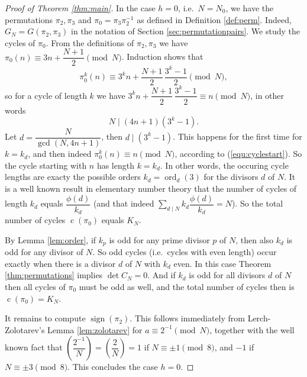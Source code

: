 \documentclass[10pt]{article}
\theoremstyle{definition}
\newcommand{\dsum}{\displaystyle\sum}
\newcommand{\jacobi}[2]{\displaystyle\left(\dfrac{#1}{#2}\right)}
\DeclareMathOperator{\ord}{ord}
\DeclareMathOperator{\sign}{sign}
\DeclareMathOperator{\cl}{c}
\begin{document}
\begin{proof}[Proof of Theorem \ref{thm:main}]
    In the case $ h = 0 $, i.e.\ $ N = N_0 $, we have the permutations $ \pi_2, \pi_3 $ and
    $ \pi_0 = \pi_3 \pi_2^{-1} $ as defined in Definition \ref{def:perm}. Indeed,
    $ G_N = G(\pi_2,\pi_3) $ in the notation of Section \ref{sec:permutationpairs}. We study the cycles of
    $ \pi_0 $. From the definitions of $ \pi_2, \pi_3 $ we have
    $ \pi_0(n) \equiv 3n + \dfrac{N+1}{2} \pmod{N} $. Induction shows that
    \begin{equation} \label{equ:cyclestart}
        \pi_0^k(n) \equiv 3^k n + \dfrac{N+1}{2} \, \dfrac{3^k-1}{2} \pmod{N} ,
    \end{equation}
    so for a cycle of length $ k $ we have
    $ 3^k n + \dfrac{N+1}{2} \, \dfrac{3^k-1}{2} \equiv n \pmod{N} $, in other words
    \begin{equation} \label{equ:cycle}
        N \mid (4n+1) (3^k-1) .
    \end{equation}
    Let $ d = \dfrac{N}{\gcd\left(N,4n+1\right)} $, then $ d \mid (3^k-1) $. This happens for the first time
    for $ k = k_d $, and then indeed $ \pi_0^k(n) \equiv n \pmod{N} $, according to (\ref{equ:cyclestart}).
    So the cycle starting with $ n $ has length $ k = k_d $. In other words, the occuring cycle lengths are
    exacty the possible orders $ k_d = \ord_d(3) $ for the divisors $ d $ of $ N $. It is a well known result
    in elementary number theory that the number of cycles of length $ k_d $ equals $ \dfrac{\phi(d)}{k_d} $
    (and that indeed $ \dsum_{d\mid N} k_d \dfrac{\phi(d)}{k_d} = N $). So the total number of
    cycles $ \cl(\pi_0) $ equals $ K_N $.

    By Lemma \ref{lem:order}, if $ k_p $ is odd for any prime divisor $ p $ of $ N $, then also $ k_d $ is
    odd for any divisor of $ N $. So odd cycles (i.e.\ cycles with even length) occur exactly when there is a
    divisor $ d $ of $ N $ with $ k_d $ even. In this case Theorem \ref{thm:permutations} implies
    $ \det C_N = 0 $. And if $ k_d $ is odd for all divisors $ d $ of $ N $ then all cycles of $ \pi_0 $ must
    be odd as well, and the total number of cycles then is $ \cl(\pi_0) = K_N $.

    It remains to compute $ \sign(\pi_2) $. This follows immediately from Lerch-Zolotarev's Lemma
    \ref{lem:zolotarev} for $ a \equiv 2^{-1} \pmod{N} $, together with the well known fact that
    $ \jacobi{2^{-1}}{N} = \jacobi{2}{N} = 1 $ if $ N \equiv \pm 1 \pmod{8} $, and $ -1 $ if
    $ N \equiv \pm 3 \pmod{8} $. This concludes the case $ h = 0 $.


\end{proof}
\end{document}
